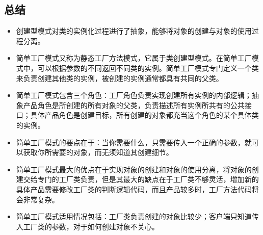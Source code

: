 \documentclass[letterpaper,10pt,english]{sphinxmanual}
\begin{document}
\subsection{总结}
\label{\detokenize{creational_patterns/simple_factory:id13}}\begin{itemize}
\item {} 
\sphinxAtStartPar
创建型模式对类的实例化过程进行了抽象，能够将对象的创建与对象的使用过程分离。

\item {} 
\sphinxAtStartPar
简单工厂模式又称为静态工厂方法模式，它属于类创建型模式。在简单工厂模式中，可以根据参数的不同返回不同类的实例。简单工厂模式专门定义一个类来负责创建其他类的实例，被创建的实例通常都具有共同的父类。

\item {} 
\sphinxAtStartPar
简单工厂模式包含三个角色：工厂角色负责实现创建所有实例的内部逻辑；抽象产品角色是所创建的所有对象的父类，负责描述所有实例所共有的公共接口；具体产品角色是创建目标，所有创建的对象都充当这个角色的某个具体类的实例。

\item {} 
\sphinxAtStartPar
简单工厂模式的要点在于：当你需要什么，只需要传入一个正确的参数，就可以获取你所需要的对象，而无须知道其创建细节。

\item {} 
\sphinxAtStartPar
简单工厂模式最大的优点在于实现对象的创建和对象的使用分离，将对象的创建交给专门的工厂类负责，但是其最大的缺点在于工厂类不够灵活，增加新的具体产品需要修改工厂类的判断逻辑代码，而且产品较多时，工厂方法代码将会非常复杂。

\item {} 
\sphinxAtStartPar
简单工厂模式适用情况包括：工厂类负责创建的对象比较少；客户端只知道传入工厂类的参数，对于如何创建对象不关心。

\end{itemize}

\sphinxstepscope
\end{document}
